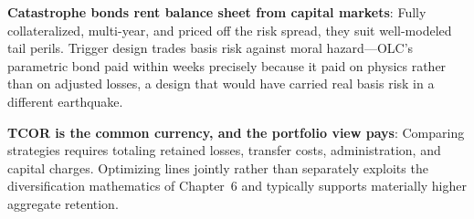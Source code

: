 \documentclass[11pt,openany]{book}
\begin{document}
\begin{keytakeaways}
\item
  \textbf{Catastrophe bonds rent balance sheet from capital markets}: Fully
  collateralized, multi-year, and priced off the risk spread, they suit
  well-modeled tail perils. Trigger design trades basis risk against moral
  hazard---OLC's parametric bond paid within weeks precisely because it paid
  on physics rather than on adjusted losses, a design that would have carried
  real basis risk in a different earthquake.
\item
  \textbf{TCOR is the common currency, and the portfolio view pays}:
  Comparing strategies requires totaling retained losses, transfer costs,
  administration, and capital charges. Optimizing lines jointly rather than
  separately exploits the diversification mathematics of
  Chapter~6 and typically supports materially higher
  aggregate retention.
\end{keytakeaways}
\end{document}
